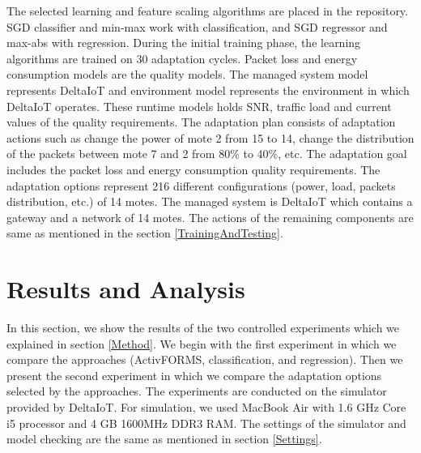 \documentclass[a4paper,12pt]{article}
\begin{document}
The selected learning and feature scaling algorithms are placed in the repository. SGD classifier and min-max work with classification, and SGD regressor and max-abs with regression. During the initial training phase, the learning algorithms are trained on 30 adaptation cycles. Packet loss and energy consumption models are the quality models. The managed system model represents DeltaIoT and environment model represents the environment in which DeltaIoT operates. These runtime models holds SNR, traffic load and current values of the quality requirements. The adaptation plan consists of adaptation actions such as change the power of mote 2 from 15 to 14, change the distribution of the packets between mote 7 and 2 from 80\% to 40\%, etc. The adaptation goal includes the packet loss and energy consumption quality requirements. The adaptation options represent 216 different configurations (power, load, packets distribution, etc.) of 14 motes. The managed system is DeltaIoT which contains a gateway and a network of 14 motes. The actions of the remaining components are same as mentioned in the section \ref{TrainingAndTesting}.
\newpage
\section{Results and Analysis} \label{ResultsAndAnalysis}
In this section, we show the results of the two controlled experiments which we explained in section \ref{Method}. We begin with the first experiment in which we compare the approaches (ActivFORMS, classification, and regression). Then we present the second experiment in which we compare the adaptation options selected by the approaches. The experiments are conducted on the simulator provided by DeltaIoT. For simulation, we used MacBook Air with 1.6 GHz Core i5 processor and 4 GB 1600MHz DDR3 RAM. The settings of the simulator and model checking are the same as mentioned in section \ref{Settings}. 
\end{document}
